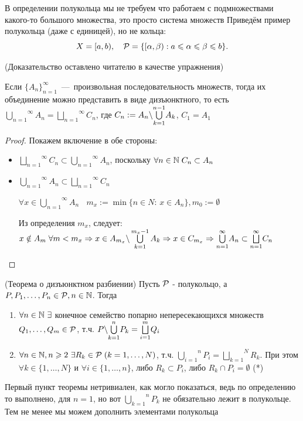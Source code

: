 \remark В определении полукольца мы не требуем что работаем с подмножествами какого-то большого множества, это просто система множеств
\example Приведём пример полукольца (даже с единицей), но не кольца: $$X = [a, b), \quad \mathcal{P} = \{[\alpha, \beta) : a \leqslant \alpha \leqslant \beta \leqslant b\}.$$ 

(Доказательство оставлено читателю в качестве упражнения)

\lemma Если $\{A_n\}_{n = 1}^{\infty}$~---~произвольная последовательность множеств, тогда их объединение можно представить в виде дизъюнктного, то есть $\overset{\infty}{\underset{n = 1}{\bigcup}} A_n = \overset{\infty}{\underset{n = 1}{\bigsqcup}} C_n$, где $C_n := A_n \backslash \overset{n-1}{\underset{k = 1}{\bigcup}} A_k$, $C_1 = A_1$

\begin{proof} Покажем включение в обе стороны:

\begin{itemize}
    \item $\overset{\infty}{\underset{n = 1}{\bigsqcup}} C_n \subset \overset{\infty}{\underset{n = 1}{\bigcup}} A_n$, поскольку $\forall n \in \mathbb{N} \; C_n \subset A_n$
    
    \item $\overset{\infty}{\underset{n = 1}{\bigcup}} A_n \subset \overset{\infty}{\underset{n = 1}{\bigsqcup}} C_n$

    $\forall x \in \overset{\infty}{\underset{n = 1}{\bigcup}} A_n\;$ $\;m_x := \min\{n \in N\text{: } x \in A_n\}, m_0 := \emptyset$

    Из определения $m_x$, следует: $x \notin A_m \; \forall m < m_x \Rightarrow x \in A_{m_x} \backslash \bigcup\limits_{k = 1}^{m_x - 1} A_k \Rightarrow x \in C_{m_x} \Rightarrow \overset{\infty}{\underset{n = 1}{\bigcup}} A_n \subset \overset{\infty}{\underset{n = 1}{\bigsqcup}} C_n$
\end{itemize}
\end{proof}
\hypertarget{disjoint_union}{}
\theorem (Теорема о дизъюнктном разбиении) Пусть $\mathcal{P}$ - полукольцо, а $P, P_1, \dots, P_n \in \mathcal{P}, n \in \mathbb{N}$. Тогда

\begin{enumerate}
    \item $\forall n \in \mathbb{N} \ \exists$ конечное семейство попарно непересекающихся множеств $Q_1, \dots, Q_m \in \mathcal{P}$, т.ч. $P \backslash \overset{n}{\underset{k = 1}{\bigcup}} P_k = \overset{m}{\underset{i = 1}{\bigsqcup}} Q_i$
    \item $\forall n \in \mathbb{N}, n \geqslant 2 \ \exists R_k \in \mathcal{P} \; (k = 1, \dots, N)$, т.ч. $\overset{n}{\underset{i = 1}{\bigcup}} P_i = \overset{N}{\underset{k = 1}{\bigsqcup}} R_k$. При этом $\forall k \in \{1, \dots, N\}$ и $\forall i \in \{1, \dots, n\}$, либо $R_k \subset P_i$, либо $R_k \cap P_i = \emptyset$ (*)
\end{enumerate}
\remark Первый пункт теоремы нетривиален, как могло показаться, ведь по определению 
то выполнено, для $n=1$, но вот $\overset{n}{\underset{k = 1}{\bigcup}} P_k$ не обязательно лежит в полукольце. Тем не менее мы можем дополнить элементами полукольца


